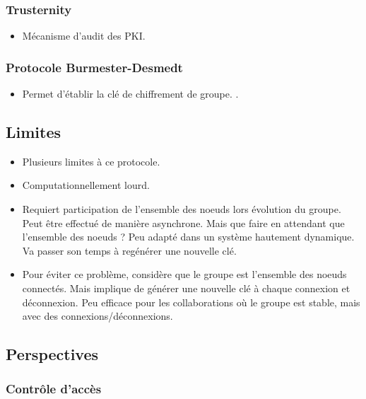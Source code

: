 \documentclass[12pt]{thesul}
\begin{document}
\subsubsection{Trusternity}

\begin{itemize}
  \item Mécanisme d'audit des PKI. \cite{2018-trusternity-short, 2018-trusternity-long}
\end{itemize}

\subsubsection{Protocole Burmester-Desmedt}

\begin{itemize}
  \item Permet d'établir la clé de chiffrement de groupe. \cite{1995-burmester-desmedt}.
\end{itemize}

\subsection{Limites}

\begin{itemize}
  \item Plusieurs limites à ce protocole.
  \item Computationnellement lourd.
  \item Requiert participation de l'ensemble des noeuds lors évolution du groupe.
    Peut être effectué de manière asynchrone.
    Mais que faire en attendant que l'ensemble des noeuds ?
    Peu adapté dans un système hautement dynamique.
    Va passer son temps à regénérer une nouvelle clé.
  \item Pour éviter ce problème, considère que le groupe est l'ensemble des noeuds connectés.
    Mais implique de générer une nouvelle clé à chaque connexion et déconnexion.
    Peu efficace pour les collaborations où le groupe est stable, mais avec des connexions/déconnexions.
\end{itemize}

\subsection{Perspectives}

\subsubsection{Contrôle d'accès}
\end{document}
